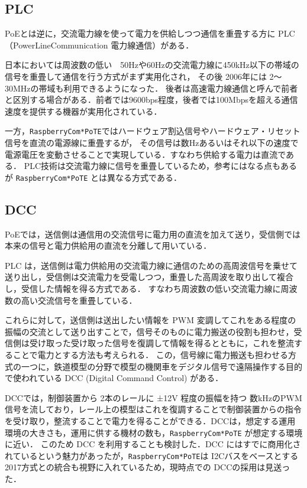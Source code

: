 
\subsection{PLC}

PoEとは逆に，交流電力線を使って電力を供給しつつ通信を重畳する方に PLC（PowerLineCommunication 電力線通信）がある．


日本においては周波数の低い　50Hzや60Hzの交流電力線に450kHz以下の帯域の信号を重畳して通信を行う方式がまず実用化され，
その後 2006年には 2〜30MHzの帯域も利用できるようになった．
後者は高速電力線通信と呼んで前者と区別する場合がある．前者では9600bps程度，後者では100Mbpsを超える通信速度を提供する機器が実用化されている．

一方，{\tt Raspberry\-Com*PoTE}ではハードウェア割込信号やハードウェア・リセット信号を直流の電源線に重畳するが，
その信号は数Hzあるいはそれ以下の速度で電源電圧を変動させることで実現している．すなわち供給する電力は直流である．
PLC技術は交流電力線に信号を重畳しているため，参考にはなる点もあるが {\tt Raspberry\-Com*PoTE} とは異なる方式である．


\subsection{DCC}



PoEでは，送信側は通信用の交流信号に電力用の直流を加えて送り，受信側では本来の信号と電力供給用の直流を分離して用いている．

PLC は，送信側は電力供給用の交流電力線に通信のための高周波信号を乗せて送り出し，受信側は交流電力を受電しつつ，重畳した高周波を取り出して複合し，受信した情報を得る方式である．
すなわち周波数の低い交流電力線に周波数の高い交流信号を重畳している．

これらに対して，送信側は送出したい情報を PWM 変調してこれをある程度の振幅の交流として送り出すことで，信号そのものに電力搬送の役割も担わせ，受信側は受け取った受け取った信号を復調して情報を得るとともに，これを整流することで電力とする方法も考えられる．
この，信号線に電力搬送も担わせる方式の一つに，鉄道模型の分野で模型の機関車をデジタル信号で遠隔操作する目的で使われている DCC (Digital Command Control) がある\cite{misc:DCC}．

DCCでは，制御装置から 2本のレールに ±12V 程度の振幅を持つ 数kHzのPWM信号を流しており，レール上の模型はこれを復調することで制御装置からの指令を受け取り，整流することで電力を得ることができる．DCCは，想定する運用環境の大きさも，運用に供する機材の数も，{\tt Raspberry\-Com*PoTE} が想定する環境に近い．
このため DCC を利用することも検討した．DCC にはすでに商用化されているという魅力があったが，{\tt Raspberry\-Com*PoTE}は I2Cバスをベースとする2017方式との統合も視野に入れているため，現時点での DCCの採用は見送った．


